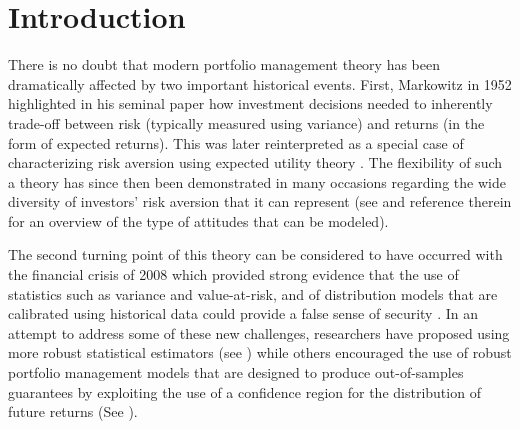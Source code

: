 \documentclass[]{interact}
\theoremstyle{plain}%
\theoremstyle{definition}
\theoremstyle{remark}
\newcommand{\0}{\V{0}}
\newcommand{\1}{\V{1}}
\theoremstyle{plain}
\theoremstyle{definition}
\begin{document}
%
\section{Introduction}
\label{sec:intro}

There is no doubt that modern portfolio management theory has been dramatically affected
by two important historical events. First, Markowitz in 1952 highlighted in his seminal
paper \cite{markowitz1952portfolio} how investment decisions needed to inherently
trade-off between risk (typically measured using variance) and returns (in the form of
expected returns). This was later reinterpreted as a special case of characterizing risk
aversion using expected utility theory \cite{neumann44:tgeb}.  The flexibility of such a
theory has since then been demonstrated in many occasions regarding the wide diversity of
investors' risk aversion that it can represent (see \cite{ingersoll87} and reference
therein for an overview of the type of attitudes that can be modeled).

The second turning point of this theory can be considered to have occurred with the
financial crisis of 2008 which provided strong evidence that the use of statistics such as
variance and value-at-risk, and of distribution models that are calibrated using historical data could
provide a false sense of security \cite{Salmon09}.  In an attempt to address some of these
new challenges, researchers have proposed using more robust statistical estimators (see
\cite{madan1998variance,goldfarb03,olivares2015robust}) while others encouraged the use of
robust portfolio management models that are designed to produce out-of-samples guarantees
by exploiting the use of a confidence region for the distribution of future returns
(See \cite{delageYe10,huangzhu10,Esfahani15,VanPary2017}).
\end{document}
